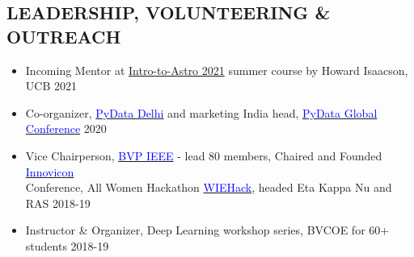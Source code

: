 \documentclass[11pt]{res} %
\newcommand{\titlegap}{5pt} %
\newcommand{\sectgap}{0.05in} %
\begin{document}
\begin{resume}
\section{LEADERSHIP, VOLUNTEERING \& OUTREACH}
\vspace{0.25in}
\begin{itemize}
    \item Incoming Mentor at \href{https://github.com/howardisaacson/Intro-to-Astro-2021}{Intro-to-Astro 2021} summer course by Howard Isaacson, UCB \hfill 2021
    \item Co-organizer, \href{https://pydata.org/}{\textcolor{blue}{PyData Delhi}} and marketing India head, \href{https://global.pydata.org}{\textcolor{blue}{PyData Global Conference}} \hfill 2020
    \item Vice Chairperson, \href{https://bvpieee.com/}{\textcolor{blue}{BVP IEEE}} - lead 80 members, Chaired and Founded \href{https://innovicon.bvpieee.com}{\textcolor{blue}{Innovicon}}\\
    Conference, All Women Hackathon \href{https://wiehack.bvpieee.com}{\textcolor{blue}{WIEHack}}, headed Eta Kappa Nu and RAS \hfill 2018-19
    \item Instructor \& Organizer, Deep Learning workshop series, BVCOE for 60+ students \hfill 2018-19
    
\end{itemize}


\vspace{\sectgap} 
\hline




\end{resume}
\end{document}
